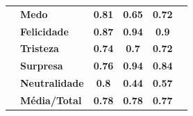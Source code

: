 \begin{table}[]
\begin{tabular}{llcccc}
                                       & \textbf{Medo}         & \textbf{0.81}                         & \textbf{0.65}                          & \textbf{0.72}                         &                                       \\
                                       & \textbf{Felicidade}   & \textbf{0.87}                         & \textbf{0.94}                          & \textbf{0.9}                          &                                       \\
                                       & \textbf{Tristeza}     & \textbf{0.74}                         & \textbf{0.7}                           & \textbf{0.72}                         &                                       \\
                                       & \textbf{Surpresa}     & \textbf{0.76}                         & \textbf{0.94}                          & \textbf{0.84}                         &                                       \\
                                       & \textbf{Neutralidade} & \textbf{0.8}                          & \textbf{0.44}                          & \textbf{0.57}                         &                                       \\
                                       & \textbf{Média/Total}  & \textbf{0.78}                         & \textbf{0.78}                          & \textbf{0.77}                         &                                       \\ \hline
\end{tabular}
\end{table}


